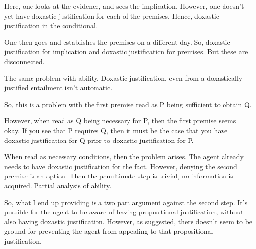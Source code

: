 \documentclass[10pt]{article}
\begin{document}
\begin{note}
Here, one looks at the evidence, and sees the implication.
However, one doesn't yet have doxastic justification for each of the premises.
Hence, doxastic justification in the conditional.

One then goes and establishes the premises on a different day.
So, doxastic justification for implication and doxastic justification for premises.
But these are disconnected.

The same problem with ability.
Doxastic justification, even from a doxastically justified entailment isn't automatic.

So, this is a problem with the first premise read as P being sufficient to obtain Q.

However, when read as Q being necessary for P, then the first premise seems okay.
If you see that P requires Q, then it must be the case that you have doxastic justification for Q prior to doxastic justification for P.

When read as necessary conditions, then the problem arises.
The agent already needs to have doxastic justification for the fact.
However, denying the second premise is an option.
Then the penultimate step is trivial, no information is acquired.
Partial analysis of ability.

So, what I end up providing is a two part argument against the second step.
It's possible for the agent to be aware of having propositional justification, without also having doxastic justification.
However, as suggested, there doesn't seem to be ground for preventing the agent from appealing to that propositional justification.
\end{note}
\end{document}
